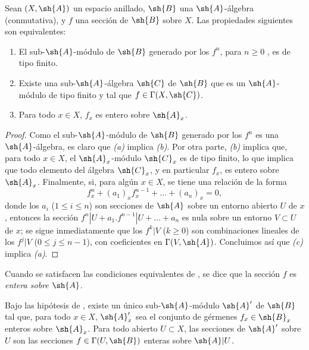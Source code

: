 \documentclass[oneside,10pt]{amsart}
\renewcommand{\leq}{\leqslant}
\renewcommand{\geq}{\geqslant}
\newcommand{\oldpage}[2][]{\marginnote{\normalfont\footnotesize\textbf{#1}~|~#2}\ignorespaces}
\let\EGAOriginalLabel\label
\renewcommand{\label}[1]{\phantomsection\EGAOriginalLabel{#1}}
\begin{document}
\begin{proposition}[6.3.1]
\label{II.6.3.1}
Sean $(X,\sh{A})$ un espacio anillado, $\sh{B}$ una $\sh{A}$-álgebra (conmutativa), y $f$ una sección de $\sh{B}$ sobre $X$.
Las propiedades siguientes son equivalentes:
\begin{enumerate}
  \item[{\rm(a)}] El sub-$\sh{A}$-módulo de $\sh{B}$ generado por los $f^n$, para $n\geq0$ \textup{}, es de tipo finito.
  \item[{\rm(b)}] Existe una sub-$\sh{A}$-álgebra $\sh{C}$ de $\sh{B}$ que es un $\sh{A}$-módulo de tipo finito y tal que $f\in\Gamma(X,\sh{C})$.
  \item[{\rm(c)}] Para todo $x\in X$, $f_x$ es entero sobre $\sh{A}_x$.
\end{enumerate}
\end{proposition}

\oldpage[II]{117}
\begin{proof}
Como el sub-$\sh{A}$-módulo de $\sh{B}$ generado por los $f^n$ es una $\sh{A}$-álgebra, es claro que \emph{(a)} implica \emph{(b)}.
Por otra parte, \emph{(b)} implica que, para todo $x\in X$, el $\sh{A}_x$-módulo $\sh{C}_x$ es de tipo finito, lo que implica que todo elemento del álgebra $\sh{C}_x$, y en particular $f_x$, es entero sobre $\sh{A}_x$.
Finalmente, si, para algún $x\in X$, se tiene una relación de la forma
\[
  f_x^n + (a_1)_xf_x^{n-1} + \ldots + (a_n)_x = 0,
\]
donde los $a_i$ ($1\leq i\leq n$) son secciones de $\sh{A}$ sobre un entorno abierto $U$ de $x$, entonces la sección $f^n|U+a_1.f^{n-1}|U+\ldots+a_n$ es nula sobre un entorno $V\subset U$ de $x$; se sigue inmediatamente que los $f^k|V$ ($k\geq0$) son combinaciones lineales de los $f^j|V$ ($0\leq j\leq n-1$), con coeficientes en $\Gamma(V,\sh{A})$.
Concluimos así que \emph{(c)} implica \emph{(a)}.
\end{proof}

Cuando se satisfacen las condiciones equivalentes de , se dice que la sección $f$ es \emph{entera sobre $\sh{A}$}.

\begin{corollary}[6.3.2]
\label{II.6.3.2}
Bajo las hipótesis de \textup{}, existe un único sub-$\sh{A}$-módulo $\sh{A}'$ de $\sh{B}$ tal que, para todo $x\in X$, $\sh{A}'_x$ sea el conjunto de gérmenes $f_x\in\sh{B}_x$ enteros sobre $\sh{A}_x$.
Para todo abierto $U\subset X$, las secciones de $\sh{A}'$ sobre $U$ son las secciones $f\in\Gamma(U,\sh{B})$ enteras sobre $\sh{A}|U$.
\end{corollary}
\end{document}

